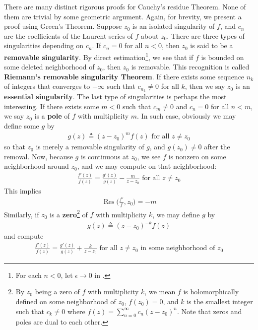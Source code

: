 \documentclass{report}
\begin{document}
There are many distinct rigorous proofs for Cauchy's residue Theorem. None of them are trivial by some geometric argument. Again, for brevity, we present a proof  using Green's Theorem. Suppose $z_0$ is an isolated singularity of  $f$, and  $c_n$ are the coefficients of the Laurent series of  $f$ about $z_0$. There are three types of singularities depending on $c_n$. If $c_n=0$ for all  $n<0$, then  $z_0$ is  said to be a \textbf{removable singularity}. By direct estimation\footnote{For each $n<0$, let $\epsilon \to 0$ in .}, we see that if  $f$ is bounded on some deleted neighborhood of $z_0$, then  $z_0$ is removable. This recognition is called  \textbf{Riemann's removable singularity Theorem}. If there exists some sequence  $n_k$ of integers that converges to  $-\infty$ such that $c_{n_k}\neq 0$ for all $k$, then we say  $z_0$  is an  \textbf{essential singularity}. The last type of singularities is perhaps the most interesting. If there exists some $m<0$ such that  $c_m\neq 0$ and $c_n=0$ for all  $n<m$, we say  $z_0$ is a \textbf{pole} of $f$ with multiplicity $m$. In such case, obviously we may define some $g$ by 
\begin{align*}
g(z)\triangleq (z-z_0)^mf(z)\text{ for all }z\neq z_0
\end{align*}
so that $z_0$ is merely a removable singularity of $g$, and $g(z_0)\neq 0$ after the removal. Now, because $g$ is continuous at  $z_0$, we see  $f$ is nonzero on some neighborhood around $z_0$, and we may compute on that neighborhood: 
\begin{align*}
\frac{f'(z)}{f(z)}= \frac{g'(z)}{g(z)}- \frac{m}{z-z_0} \text{ for all }z\neq z_0
\end{align*}
This implies 
\begin{align*}
\operatorname{Res}\Big(\frac{f'}{f},z_0\Big)=-m
\end{align*}
Similarly, if $z_0$ is a  \textbf{zero}\footnote{By $z_0$ being a zero of  $f$ with multiplicity  $k$, we mean  $f$ is holomorphically defined on some neighborhood of $z_0$, $f(z_0)=0$, and $k$ is the smallest integer such that  $c_k\neq 0$ where $f(z)=\sum_{n=0}^{\infty}c_n(z-z_0)^n$. Note that zeros and poles are dual to each other.}  of $f$ with multiplicity $k$, we may define  $g$ by 
\begin{align*}
g(z)\triangleq (z-z_0)^{-k}f(z)
\end{align*}
and compute 
\begin{align*}
\frac{f'(z)}{f(z)}= \frac{g'(z)}{g(z)}+ \frac{k}{z-z_0}\text{ for all }z\neq z_0 \text{ in some neighborhood of }z_0
\end{align*}
\end{document}
